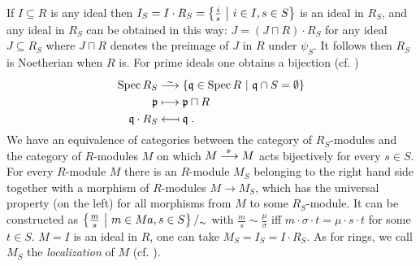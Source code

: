 \documentclass[a4paper,parskip=half,numbers=enddot, DIV=12]{scrreprt}
\begin{document}
If $I\subseteq R$ is any ideal then $I_S = I\cdot R_S = \left\{\frac{i}{s}\ \middle|\  i\in I, s\in S\right\}$ is an ideal in $R_S$, and any ideal in $R_S$ can be obtained in this way: $J= (J\sqcap R)\cdot R_S$ for any ideal $J\subseteq R_S$ where $J\sqcap R$ denotes the preimage of $J$ in $R$ under $\psi_S$. It follows then $R_S$ is Noetherian when $R$ is. For prime ideals one obtains a bijection (cf. \cite[Corollary~2.3.1(e)]{alg1})
\begin{align*}
\Spec R_S & \isomorphism\left\{\qq\in\Spec R\st \qq\cap S=\emptyset\right\}\\
\pp &\longmapsto \pp\sqcap R\\
\qq\cdot R_S &\longmapsfrom \qq\;.
\end{align*}
We have an equivalence of categories between the category of $R_S$-modules and the category of $R$-modules $M$ on which $M \morphism[s\cdot] M$ acts bijectively for every $s\in S$. For every $R$-module $M$ there is an $R$-module $M_S$ belonging to the right hand side together with a morphism of $R$-modules $M\to M_S$, which has the universal property (on the left) for all morphisms from $M$ to some $R_S$-module. It can be constructed as $\left\{\frac{m}{s}\ \middle|\  m \in M a, s\in S\right\}/_\sim$ with $\frac{m}{s}\sim \frac{\mu}{\sigma}$ iff $m\cdot\sigma\cdot t = \mu\cdot s\cdot t$ for some $t\in S$. $M=I$ is an ideal in $R$, one can take $M_S = I_S = I\cdot R_S$. As for rings, we call $M_S$  the \emph{localization} of $M$ (cf. \cite[Proposition~2.3.2]{alg1}).
\end{document}

